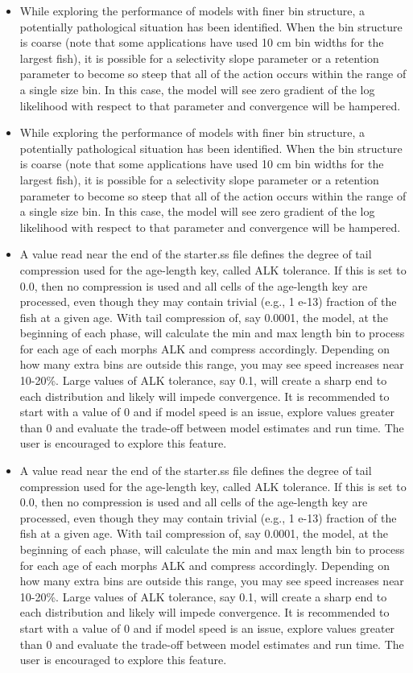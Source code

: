 \begin{itemize}
	\item While exploring the performance of models with finer bin structure, a potentially pathological situation has been identified. When the bin structure is coarse (note that some applications have used 10 cm bin widths for the largest fish), it is possible for a selectivity slope parameter or a retention parameter to become so steep that all of the action occurs within the range of a single size bin. In this case, the model will see zero gradient of the log likelihood with respect to that parameter and convergence will be hampered.
	\item While exploring the performance of models with finer bin structure, a potentially pathological situation has been identified. When the bin structure is coarse (note that some applications have used 10 cm bin widths for the largest fish), it is possible for a selectivity slope parameter or a retention parameter to become so steep that all of the action occurs within the range of a single size bin. In this case, the model will see zero gradient of the log likelihood with respect to that parameter and convergence will be hampered.
	
	\item A value read near the end of the starter.ss file defines the degree of tail compression used for the age-length key, called ALK tolerance. If this is set to 0.0, then no compression is used and all cells of the age-length key are processed, even though they may contain trivial (e.g., 1 e-13) fraction of the fish at a given age. With tail compression of, say 0.0001, the model, at the beginning of each phase, will calculate the min and max length bin to process for each age of each morphs ALK and compress accordingly. Depending on how many extra bins are outside this range, you may see speed increases near 10-20\%. Large values of ALK tolerance, say 0.1, will create a sharp end to each distribution and likely will impede convergence. It is recommended to start with a value of 0 and if model speed is an issue, explore values greater than 0 and evaluate the trade-off between model estimates and run time. The user is encouraged to explore this feature.
	\item A value read near the end of the starter.ss file defines the degree of tail compression used for the age-length key, called ALK tolerance. If this is set to 0.0, then no compression is used and all cells of the age-length key are processed, even though they may contain trivial (e.g., 1 e-13) fraction of the fish at a given age. With tail compression of, say 0.0001, the model, at the beginning of each phase, will calculate the min and max length bin to process for each age of each morphs ALK and compress accordingly. Depending on how many extra bins are outside this range, you may see speed increases near 10-20\%. Large values of ALK tolerance, say 0.1, will create a sharp end to each distribution and likely will impede convergence. It is recommended to start with a value of 0 and if model speed is an issue, explore values greater than 0 and evaluate the trade-off between model estimates and run time. The user is encouraged to explore this feature.
\end{itemize}


